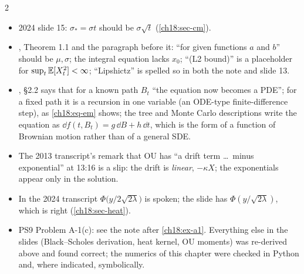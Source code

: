 \begin{paracol}{2}
\begin{coursenote}
\begin{itemize}
  \item 2024 slide 15: $\sigma_*=\sigma t$ should be $\sigma\sqrt t$ (\cref{ch18:sec-cm}).
  \item {}, Theorem 1.1 and the paragraph before it: ``for given functions $a$ and $b$'' should be $\mu,\sigma$; the integral equation lacks $x_0$; ``(L2 bound)'' is a placeholder for $\sup_t\mathbb{E}[X_t^2]<\infty$; ``Lipshictz'' is spelled so in both the note and slide 13.
  \item {}, \S2.2 says that for a known path $B_t$ ``the equation now becomes a PDE''; for a fixed path it is a recursion in one variable (an ODE-type finite-difference step), as \eqref{ch18:eq-em} shows; the tree and Monte Carlo descriptions write the equation as $\dd f(t,B_t)=g\,\dd B+h\,\dd t$, which is the form of a function of Brownian motion rather than of a general SDE.
  \item The 2013 transcript's remark that OU has ``a drift term \dots\ minus exponential'' at 13:16 is a slip: the drift is \emph{linear}, $-\kappa X$; the exponentials appear only in the solution.
  \item In the 2024 transcript $\Phi\bigl(y/2\sqrt{2\lambda}\bigr)$ is spoken; the slide has $\Phi(y/\sqrt{2\lambda})$, which is right (\cref{ch18:sec-heat}).
  \item PS9 Problem A-1(c): see the note after \cref{ch18:ex-a1}. Everything else in the slides (Black--Scholes derivation, heat kernel, OU moments) was re-derived above and found correct; the numerics of this chapter were checked in Python and, where indicated, symbolically.
\end{itemize}
\end{coursenote}


\end{paracol}
